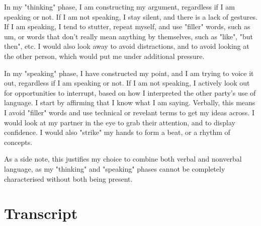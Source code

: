 \documentclass[12pt]{article}
\begin{document}
In my "thinking" phase, I am constructing my argument, regardless if I am speaking or not. If I am not speaking, I stay silent, and there is a lack of gestures. If I am speaking, I tend to stutter, repeat myself, and use "filler" words, such as um, or words that don't really mean anything by themselves, such as "like", "but then", etc. I would also look away to avoid distractions, and to avoid looking at the other person, which would put me under additional pressure.

In my "speaking" phase, I have constructed my point, and I am trying to voice it out, regardless if I am speaking or not. If I am not speaking, I actively look out for opportunities to interrupt, based on how I interpreted the other party's use of language. I start by affirming that I know what I am saying. Verbally, this means I avoid "filler" words and use technical or revelant terms to get my ideas across. I would look at my partner in the eye to grab their attention, and to display confidence. I would also "strike" my hands to form a beat, or a rhythm of concepts.

As a side note, this justifies my choice to combine both verbal and nonverbal language, as my "thinking" and "speaking" phases cannot be completely characterised without both being present.

\appendix

\section{Transcript} \label{transcript}
\end{document}
